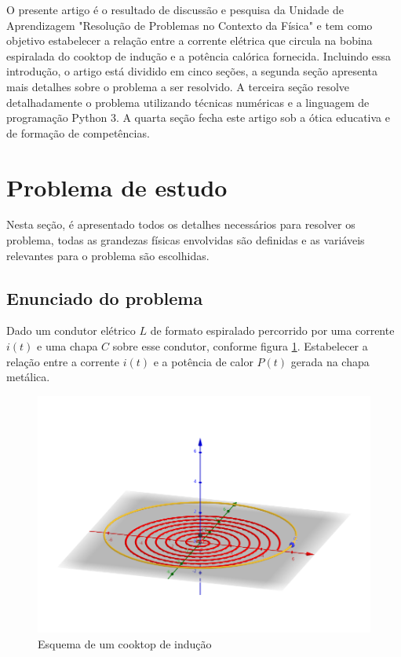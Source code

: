 \documentclass[
	article,			%
	11pt,				%
	oneside,			%
	a4paper,			%
	english,			%
	brazil,				%
	sumario=tradicional
	]{abntex2}
\begin{document}
O presente artigo é o resultado de discussão e pesquisa da Unidade de Aprendizagem "Resolução de Problemas no Contexto da Física" e tem como objetivo estabelecer a relação entre a corrente elétrica que circula na bobina espiralada do cooktop de indução e a potência calórica fornecida. Incluindo essa introdução, o artigo está dividido em cinco seções, a segunda seção apresenta mais detalhes sobre o problema a ser resolvido. A terceira seção resolve detalhadamente o problema utilizando técnicas numéricas e a linguagem de programação Python 3. A quarta seção fecha este artigo sob a ótica educativa e de formação de competências.

\section{Problema de estudo}

Nesta seção, é apresentado todos os detalhes necessários para resolver os problema, todas as grandezas físicas envolvidas são definidas e as variáveis relevantes para o problema são escolhidas.

\subsection{Enunciado do problema}

Dado um condutor elétrico $ L $ de formato espiralado percorrido por uma corrente $ i(t) $ e uma chapa $ C $ sobre esse condutor, conforme figura \ref{fig:esquema}. Estabelecer a relação entre a corrente $ i(t) $ e a potência de calor $ P(t) $ gerada na chapa metálica.

\begin{figure}[h]
	\centering
	\includegraphics[width=0.7\linewidth]{figures/fig1}
	\caption[Esquema de um cooktop de indução]{Esquema de um cooktop de indução}
	\label{fig:esquema}
\end{figure}
\end{document}
